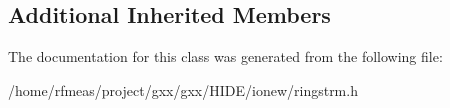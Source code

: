 \subsection*{Additional Inherited Members}


The documentation for this class was generated from the following file\+:\begin{DoxyCompactItemize}
\item 
/home/rfmeas/project/gxx/gxx/\+H\+I\+D\+E/ionew/ringstrm.\+h\end{DoxyCompactItemize}
